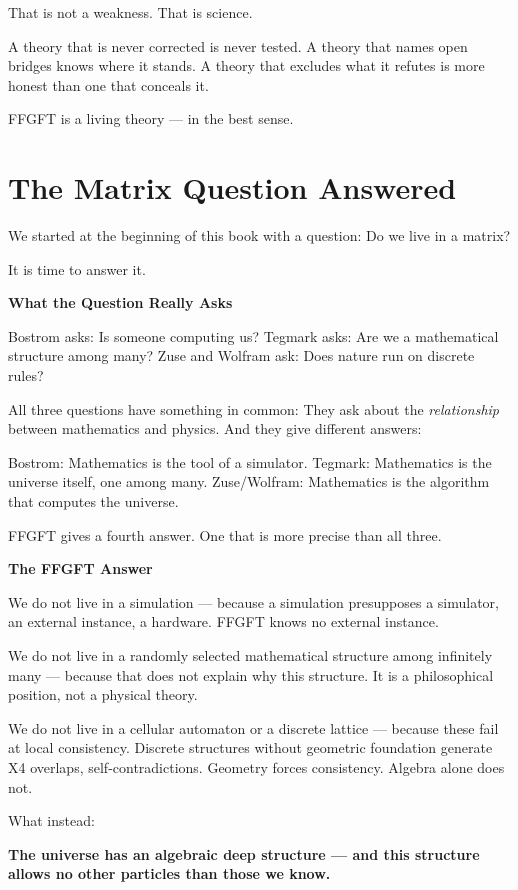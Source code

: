 \documentclass[11pt,oneside]{book}
\begin{document}
That is not a weakness. That is science.

A theory that is never corrected is never tested. A theory that names open
bridges knows where it stands. A theory that excludes what it refutes is
more honest than one that conceals it.

FFGFT is a living theory — in the best sense.


\chapter{The Matrix Question Answered}

We started at the beginning of this book with a question: Do we live in a
matrix?

It is time to answer it.

\textbf{What the Question Really Asks}

Bostrom asks: Is someone computing us? Tegmark asks: Are we a mathematical
structure among many? Zuse and Wolfram ask: Does nature run on discrete
rules?

All three questions have something in common: They ask about the
\textit{relationship} between mathematics and physics. And they give different
answers:

Bostrom: Mathematics is the tool of a simulator.
Tegmark: Mathematics is the universe itself, one among many.
Zuse/Wolfram: Mathematics is the algorithm that computes the universe.

FFGFT gives a fourth answer. One that is more precise than all three.

\textbf{The FFGFT Answer}

We do not live in a simulation — because a simulation presupposes a
simulator, an external instance, a hardware. FFGFT knows no external
instance.

We do not live in a randomly selected mathematical structure among
infinitely many — because that does not explain why this structure. It is a
philosophical position, not a physical theory.

We do not live in a cellular automaton or a discrete lattice — because these
fail at local consistency. Discrete structures without geometric foundation
generate X4 overlaps, self-contradictions. Geometry forces consistency.
Algebra alone does not.

What instead:

\textbf{The universe has an algebraic deep structure — and this structure
allows no other particles than those we know.}
\end{document}

